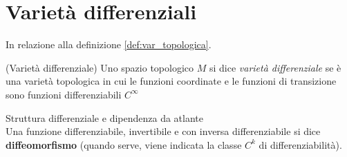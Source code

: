 \section{Varietà differenziali}
\label{sec:vardiff}
In relazione alla definizione \ref{def:var_topologica}.
\begin{definition}{(Varietà differenziale)}
   Uno spazio topologico $M$ si dice \emph{varietà differenziale} se è una
   varietà topologica in cui le funzioni coordinate e le funzioni di transizione
   sono funzioni differenziabili $C^\infty$
\end{definition}

Struttura differenziale e dipendenza da atlante\\

Una funzione differenziabile, invertibile e con inversa differenziabile si dice
\textbf{diffeomorfismo} (quando serve, viene indicata la classe $C^k$ di differenziabilità).
